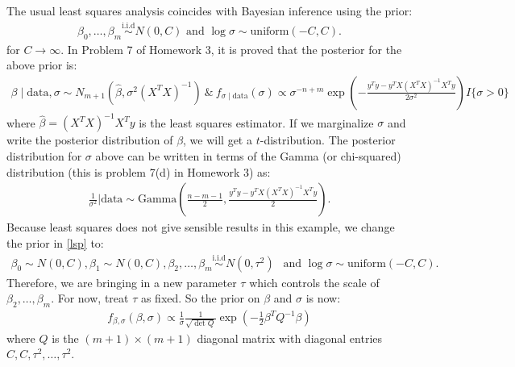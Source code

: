 \documentclass{scrartcl}
\begin{document}
The usual least squares analysis coincides with Bayesian inference
using the prior:
\begin{align}\label{lsp}
  \beta_0, \dots, \beta_m \overset{\text{i.i.d}}{\sim} N(0, C)
  \text{ and } \log \sigma \sim \text{uniform}(-C, C). 
\end{align}
for $C \rightarrow \infty$. In Problem 7 of Homework 3, it is proved
that the posterior for the above prior is: 
\begin{align*}
  \beta \mid \text{data}, \sigma \sim N_{m+1}(\hat{\beta}, \sigma^2
  (X^T X)^{-1}) ~ \& ~  f_{\sigma \mid \text{data}}(\sigma)
  \propto \sigma^{-n+m} \exp \left(-\frac{y^T y - y^T X (X^T X)^{-1}
  X^T y}{2
  \sigma^2} \right) I\{\sigma > 0\}
\end{align*}
where $\hat{\beta} = (X^T X)^{-1} X^T y$ is the least squares
estimator. If we marginalize $\sigma$ and write the posterior
distribution of $\beta$, we will get a $t$-distribution. The posterior
distribution for $\sigma$ above can be written in terms of the Gamma
(or chi-squared) distribution (this is problem 7(d) in Homework 3) as:
\begin{align*}
  \frac{1}{\sigma^2} \Big| \text{data} \sim
 \text{Gamma} \left(\frac{n-m-1}{2}, \frac{y^T y -
  y^T X (X^T X)^{-1} X^T y}{2}
  \right). 
\end{align*}
Because least squares does not give
sensible results in this example, we change the prior in \eqref{lsp}
to:  
\begin{align*}
  \beta_0 \sim N(0, C), \beta_1 \sim N(0, C), \beta_2, \dots, \beta_m
  \overset{\text{i.i.d}}{\sim} N(0, \tau^2) ~~ \text{ and }
  \log \sigma \sim \text{uniform}(-C, C). 
\end{align*}
Therefore, we are bringing in a new parameter $\tau$ which controls
the scale of $\beta_2, \dots, \beta_m$. For now, treat $\tau$ as
fixed. So the prior on $\beta$ and $\sigma$ is now: 
\begin{align*}
  f_{\beta, \sigma}(\beta, \sigma) \propto  \frac{1}{\sigma}
  \frac{1}{\sqrt{\det Q}} \exp \left(-\frac{1}{2} \beta^T Q^{-1} \beta \right)
\end{align*}
where $Q$ is the $(m+1) \times (m+1)$ diagonal matrix with diagonal
entries $C, C, \tau^2, \dots, \tau^2$. 
\end{document}
